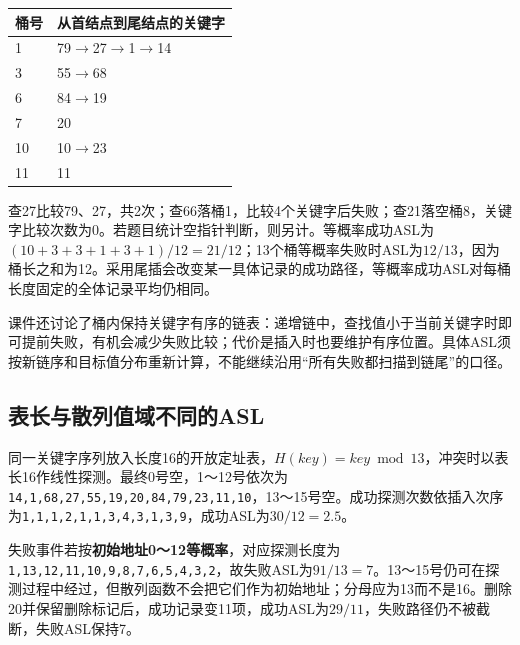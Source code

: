 \par\medskip\noindent\begin{minipage}{\linewidth}\fontsize{9.3}{12}\selectfont\begin{tabularx}{\linewidth}{@{}YY@{}}
\toprule\noalign{}
桶号 & 从首结点到尾结点的关键字 \\
\midrule\noalign{}


1 & 79\ensuremath{\to}27\ensuremath{\to}1\ensuremath{\to}14 \\
3 & 55\ensuremath{\to}68 \\
6 & 84\ensuremath{\to}19 \\
7 & 20 \\
10 & 10\ensuremath{\to}23 \\
11 & 11 \\
\bottomrule\end{tabularx}
\end{minipage}\par\medskip

查27比较79、27，共2次；查66落桶1，比较4个关键字后失败；查21落空桶8，关键字比较次数为0。若题目统计空指针判断，则另计。等概率成功ASL为\((10+3+3+1+3+1)/12=21/12\)；13个桶等概率失败时ASL为\(12/13\)，因为桶长之和为12。采用尾插会改变某一具体记录的成功路径，等概率成功ASL对每桶长度固定的全体记录平均仍相同。

课件还讨论了桶内保持关键字有序的链表：递增链中，查找值小于当前关键字时即可提前失败，有机会减少失败比较；代价是插入时也要维护有序位置。具体ASL须按新链序和目标值分布重新计算，不能继续沿用``所有失败都扫描到链尾''的口径。

\subsection{表长与散列值域不同的ASL}\label{DS07-hash-asl-course}

同一关键字序列放入长度16的开放定址表，\(H(key)=key\bmod13\)，冲突时以表长16作线性探测。最终0号空，1～12号依次为\texttt{14,\allowbreak{}1,\allowbreak{}68,\allowbreak{}27,\allowbreak{}55,\allowbreak{}19,\allowbreak{}20,\allowbreak{}84,\allowbreak{}79,\allowbreak{}23,\allowbreak{}11,\allowbreak{}10}，13～15号空。成功探测次数依插入次序为\texttt{1,\allowbreak{}1,\allowbreak{}1,\allowbreak{}2,\allowbreak{}1,\allowbreak{}1,\allowbreak{}3,\allowbreak{}4,\allowbreak{}3,\allowbreak{}1,\allowbreak{}3,\allowbreak{}9}，成功ASL为\(30/12=2.5\)。

失败事件若按\textbf{初始地址0～12等概率}，对应探测长度为\texttt{1,\allowbreak{}13,\allowbreak{}12,\allowbreak{}11,\allowbreak{}10,\allowbreak{}9,\allowbreak{}8,\allowbreak{}7,\allowbreak{}6,\allowbreak{}5,\allowbreak{}4,\allowbreak{}3,\allowbreak{}2}，故失败ASL为\(91/13=7\)。13～15号仍可在探测过程中经过，但散列函数不会把它们作为初始地址；分母应为13而不是16。删除20并保留删除标记后，成功记录变11项，成功ASL为\(29/11\)，失败路径仍不被截断，失败ASL保持7。

